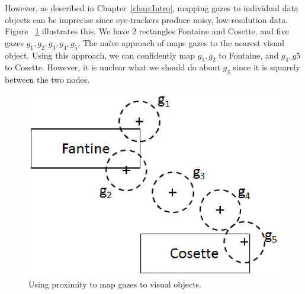 However, as described in Chapter~\ref{chap:Intro}, mapping gazes to individual data objects can be imprecise since eye-trackers produce noisy, low-resolution data. Figure ~\ref{fig:MiserablesGaze} illustrates this. We have 2 rectangles Fontaine and Cosette, and five gazes $g_1, g_2, g_3, g_4, g_5$. The na\"{i}ve approach of maps gazes to the nearest visual object. Using this approach, we can confidently map $g_1, g_2$ to Fontaine, and $g_4, g5$ to Cosette. However, it is unclear what we should do about $g_3$ since it is squarely between the two nodes. 

\begin{figure}[htb]
  \centering
  \includegraphics[width=0.75\linewidth]{images/MiserablesGaze.eps}
  \caption{Using proximity to map gazes to visual objects. }
    \label{fig:MiserablesGaze}
\end{figure}